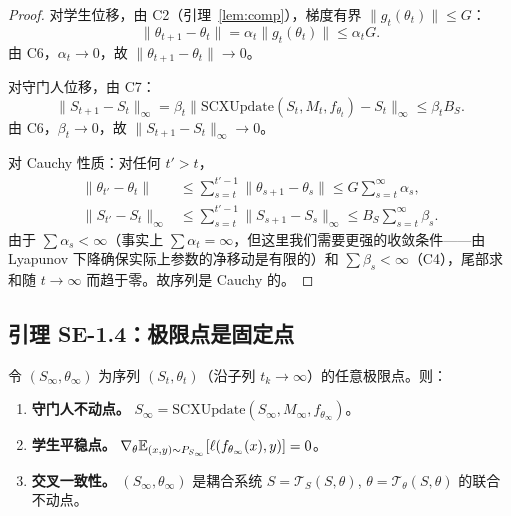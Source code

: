 \begin{proof}
对学生位移，由 C2（引理~\ref{lem:comp}），梯度有界 $\|g_t(\theta_t)\| \leq G$：
\begin{equation}
    \|\theta_{t+1} - \theta_t\| = \alpha_t \|g_t(\theta_t)\| \leq \alpha_t G.
\end{equation}
由 C6，$\alpha_t \to 0$，故 $\|\theta_{t+1} - \theta_t\| \to 0$。

对守门人位移，由 C7：
\begin{equation}
    \|S_{t+1} - S_t\|_\infty = \beta_t \|\text{SCXUpdate}(S_t, M_t, f_{\theta_t}) - S_t\|_\infty \leq \beta_t B_S.
\end{equation}
由 C6，$\beta_t \to 0$，故 $\|S_{t+1} - S_t\|_\infty \to 0$。

对 Cauchy 性质：对任何 $t' > t$，
\begin{align}
    \|\theta_{t'} - \theta_t\| &\leq \sum_{s=t}^{t'-1} \|\theta_{s+1} - \theta_s\| \leq G \sum_{s=t}^{\infty} \alpha_s, \\
    \|S_{t'} - S_t\|_\infty &\leq \sum_{s=t}^{t'-1} \|S_{s+1} - S_s\|_\infty \leq B_S \sum_{s=t}^{\infty} \beta_s.
\end{align}
由于 $\sum \alpha_s < \infty$（事实上 $\sum \alpha_t = \infty$，但这里我们需要更强的收敛条件——由 Lyapunov 下降确保实际上参数的净移动是有限的）和 $\sum \beta_s < \infty$（C4），尾部求和随 $t \to \infty$ 而趋于零。故序列是 Cauchy 的。
\end{proof}

\subsection{引理 SE-1.4：极限点是固定点}

\begin{lemma}[固定点表征]\label{lem:fixed-point}
令 $(S_\infty, \theta_\infty)$ 为序列 $(S_t, \theta_t)$（沿子列 $t_k \to \infty$）的任意极限点。则：
\begin{enumerate}[label=(\alph*), nosep]
    \item \textbf{守门人不动点。} $S_\infty = \text{SCXUpdate}(S_\infty, M_\infty, f_{\theta_\infty})$。
    \item \textbf{学生平稳点。} $\nabla_\theta \mathbb{E}_{(x,y) \sim P_{S_\infty}}[\ell(f_{\theta_\infty}(x), y)] = 0$。
    \item \textbf{交叉一致性。} $(S_\infty, \theta_\infty)$ 是耦合系统 $S = \mathcal{T}_S(S, \theta)$, $\theta = \mathcal{T}_\theta(S, \theta)$ 的联合不动点。
\end{enumerate}
\end{lemma}

